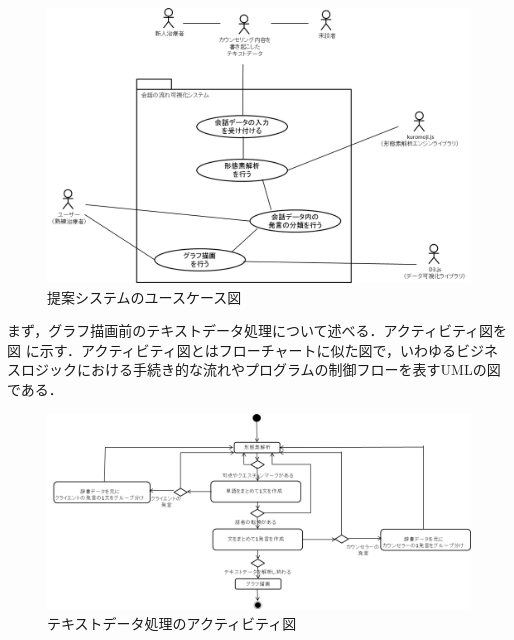 \documentclass[shuuron]{kuee}
\begin{document}
\begin{figure}
  \begin{center}
    \includegraphics[width=\linewidth]{use_case_diagram.png}
  \end{center}
  \caption{提案システムのユースケース図}
  \label{fig:use_case_diagram}
\end{figure}


まず，グラフ描画前のテキストデータ処理について述べる．アクティビティ図を図
に示す．アクティビティ図とはフローチャートに似た図で，いわゆるビジネスロジックにおける手続き的な流れやプログラムの制御フローを表すUMLの図である．
\begin{figure}
  \begin{center}
    \includegraphics[width=\linewidth]{activity.png}
  \end{center}
  \caption{テキストデータ処理のアクティビティ図}
  \label{fig:activity}
\end{figure}
\end{document}

